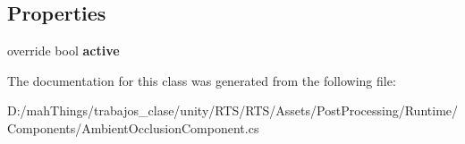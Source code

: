 \subsection*{Properties}
\begin{DoxyCompactItemize}
\item 
\mbox{\label{class_unity_engine_1_1_post_processing_1_1_ambient_occlusion_component_a5fa0bbd6818c812f5ffb524b6467fb5c}} 
override bool {\bfseries active}
\end{DoxyCompactItemize}


The documentation for this class was generated from the following file\+:\begin{DoxyCompactItemize}
\item 
D\+:/mah\+Things/trabajos\+\_\+clase/unity/\+R\+T\+S/\+R\+T\+S/\+Assets/\+Post\+Processing/\+Runtime/\+Components/Ambient\+Occlusion\+Component.\+cs\end{DoxyCompactItemize}
